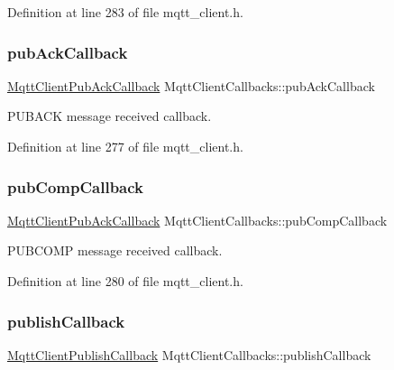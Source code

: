 Definition at line 283 of file mqtt\+\_\+client.\+h.

\mbox{\label{structMqttClientCallbacks_a5dd66ac0e95defbed26465e92c3fa276}} 
\subsubsection{\texorpdfstring{pub\+Ack\+Callback}{pubAckCallback}}
{\footnotesize\ttfamily \hyperlink{mqtt__client_8h_a795fdcc921902cd871b766c91770a469}{Mqtt\+Client\+Pub\+Ack\+Callback} Mqtt\+Client\+Callbacks\+::pub\+Ack\+Callback}



P\+U\+B\+A\+CK message received callback. 



Definition at line 277 of file mqtt\+\_\+client.\+h.

\mbox{\label{structMqttClientCallbacks_a3ef4a297e0e79521044a956a560a1cb4}} 
\subsubsection{\texorpdfstring{pub\+Comp\+Callback}{pubCompCallback}}
{\footnotesize\ttfamily \hyperlink{mqtt__client_8h_a795fdcc921902cd871b766c91770a469}{Mqtt\+Client\+Pub\+Ack\+Callback} Mqtt\+Client\+Callbacks\+::pub\+Comp\+Callback}



P\+U\+B\+C\+O\+MP message received callback. 



Definition at line 280 of file mqtt\+\_\+client.\+h.

\mbox{\label{structMqttClientCallbacks_a2cb4f90abda3eedfdc20771ce9e3fe94}} 
\subsubsection{\texorpdfstring{publish\+Callback}{publishCallback}}
{\footnotesize\ttfamily \hyperlink{mqtt__client_8h_a4759a59946ab022e19349ed194794897}{Mqtt\+Client\+Publish\+Callback} Mqtt\+Client\+Callbacks\+::publish\+Callback}



